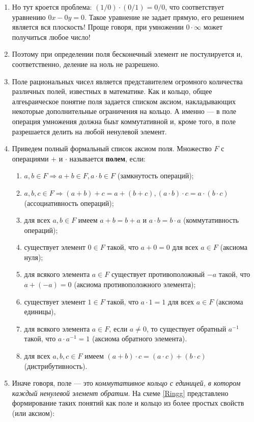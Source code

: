 \begin{enumerate}
\item Но тут кроется проблема: $(1/0)\cdot(0/1)=0/0$, что соответствует уравнению $0x-0y=0$. Такое уравнение не задает прямую, его решением является вся плоскость! Проще говоря, при умножении $0\cdot\infty$ может получиться любое число!
\item Поэтому при определении поля бесконечный элемент не постулируется и, соответственно, деление на ноль не разрешено.
\item Поле рациональных чисел является представителем огромного количества различных полей, известных в математике. Как и кольцо, общее алгеьраическое понятие поля задается списком аксиом, накладывающих некоторые дополнительные ограничения на кольцо. А именно --- в поле операция умножения должна быьт коммутативной и, кроме того, в поле разрешается делить на любой ненулевой элемент.
\item Приведем полный формальный список аксиом поля. Множество $F$ с операциями $+$ и $\cdot$ называется \textbf{полем}, если:\label{FildAxiom}
\begin{enumerate}[{\bf F}1]
\item $a,b\in F\Rightarrow a+b\in F, a\cdot b\in F$ (замкнутость операций);
\item $a,b,c\in F\Rightarrow (a+b)+c=a+(b+c), (a\cdot b)\cdot c = a\cdot (b\cdot c)$ (ассоциативность операций);
\item для всех $a,b\in F$ имеем $a+b=b+a$ и $a\cdot b=b\cdot a$ (коммутативность операций);
\item существует элемент $0\in F$ такой, что $a+0=0$ для всех $a\in F$ (аксиома нуля);
\item для всякого элемента $a\in F$ существует противоположный $-a$ такой, что $a+(-a)=0$ (аксиома противоположного элемента);
\item существует элемент $1\in F$ такой, что $a\cdot 1=1$ для всех $a\in F$ (аксиома единицы),
\item для всякого элемента $a\in F$, если $a\ne 0$, то существует обратный $a^{-1}$ такой, что $a\cdot a^{-1}=1$ (аксиома обратного элемента).
\item для всех $a,b,c\in F$ имеем $(a+b)\cdot c=(a\cdot c)+(b\cdot c)$ (дистрибутивность).
\end{enumerate}
\item Иначе говоря, поле --- это \textit{коммутативное кольцо с единицей, в котором каждый ненулевой элемент обратим}. На схеме \ref{Ringg} представлено формирование таких понятий как поле и кольцо из более простых свойств (или аксиом):

\end{enumerate}
